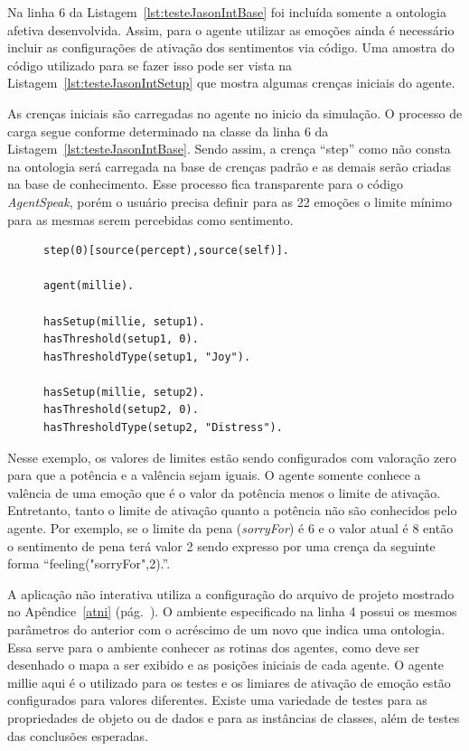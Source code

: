 Na linha 6 da Listagem~\ref{lst:testeJasonIntBase} foi incluída somente
a ontologia afetiva desenvolvida. Assim, para o agente
utilizar as emoções ainda é necessário incluir as configurações de ativação
dos sentimentos via código. Uma amostra do código utilizado para se fazer isso
pode ser vista na Listagem~\ref{lst:testeJasonIntSetup} que mostra algumas
crenças iniciais do agente.

As crenças iniciais são carregadas no agente no inicio da simulação. O processo
de carga segue conforme determinado na classe da linha 6 da
Listagem~\ref{lst:testeJasonIntBase}. Sendo assim, a crença ``step'' como não
consta na ontologia será carregada na base de crenças padrão e as demais serão
criadas na base de conhecimento. Esse processo fica transparente
para o código \emph{AgentSpeak}, porém o usuário precisa definir para as 22
emoções o limite mínimo para as mesmas serem percebidas como sentimento.

\lstset{linewidth=80mm}
\begin{figure}
	\begin{lstlisting}[frame=trbl,
caption=Parte do código do agente para aplicação interativa de teste.,
label=lst:testeJasonIntSetup]
step(0)[source(percept),source(self)].

agent(millie).

hasSetup(millie, setup1).
hasThreshold(setup1, 0).
hasThresholdType(setup1, "Joy").

hasSetup(millie, setup2).
hasThreshold(setup2, 0).
hasThresholdType(setup2, "Distress").
	\end{lstlisting}
\end{figure}

Nesse exemplo, os valores de limites estão sendo configurados com valoração
zero para que a potência e a valência sejam iguais. O agente somente conhece
a valência de uma emoção que é o valor da potência menos o limite de
ativação. Entretanto, tanto o limite de ativação quanto a potência não são
conhecidos pelo agente. Por exemplo, se o limite da pena (\emph{sorryFor}) é 6
e o valor atual é 8 então o sentimento de pena terá valor 2 sendo
expresso por uma crença da seguinte forma ``feeling("sorryFor",2).''.


A aplicação não interativa utiliza a configuração do arquivo de projeto mostrado no
Apêndice~\ref{atni} (pág.~\pageref{atni}).
O ambiente especificado na linha 4 possui os mesmos
parâmetros do anterior com o acréscimo de um novo que indica uma ontologia.
Essa serve para o ambiente conhecer as rotinas dos agentes, como
deve ser desenhado o mapa a ser exibido e as posições iniciais de cada
agente. O agente millie aqui é o utilizado para os testes e os limiares de
ativação de emoção estão configurados para valores diferentes. Existe uma
variedade de testes para as propriedades de objeto ou de dados e para as
instâncias de classes, além de testes das conclusões esperadas.

